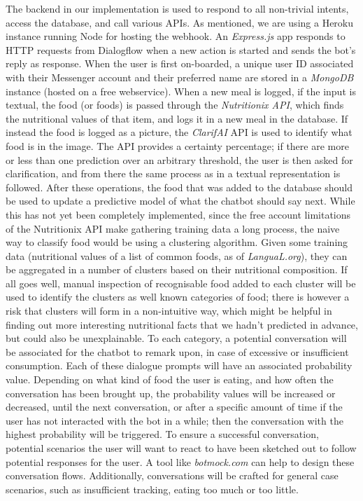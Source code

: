 \documentclass{scrartcl}
\begin{document}
The backend in our implementation is used to respond to all non-trivial intents, access the database, and call various APIs. As mentioned, we are using a Heroku instance running Node for hosting the webhook. An \textit{Express.js} app responds to HTTP requests from Dialogflow when a new action is started and sends the bot's reply as response. When the user is first on-boarded, a unique user ID associated with their Messenger account and their preferred name are stored in a \textit{MongoDB} instance (hosted on a free webservice). When a new meal is logged, if the input is textual, the food (or foods) is passed through the \textit{Nutritionix API}, which finds the nutritional values of that item, and logs it in a new meal in the database. If instead the food is logged as a picture, the \textit{ClarifAI} API is used to identify what food is in the image. The API provides a certainty percentage; if there are more or less than one prediction over an arbitrary threshold, the user is then asked for clarification, and from there the same process as in a textual representation is followed. After these operations, the food that was added to the database should be used to update a predictive model of what the chatbot should say next. While this has not yet been completely implemented, since the free account limitations of the Nutritionix API make gathering training data a long process, the naive way to classify food would be using a clustering algorithm. Given some training data (nutritional values of a list of common foods, as of \textit{LanguaL.org}), they can be aggregated in a number of clusters based on their nutritional composition. If all goes well, manual inspection of recognisable food added to each cluster will be used to identify the clusters as well known categories of food; there is however a risk that clusters will form in a non-intuitive way, which might be helpful in finding out more interesting nutritional facts that we hadn't predicted in advance, but could also be unexplainable. To each category, a potential conversation will be associated for the chatbot to remark upon, in case of excessive or insufficient consumption. Each of these dialogue prompts will have an associated probability value. Depending on what kind of food the user is eating, and how often the conversation has been brought up, the probability values will be increased or decreased, until the next conversation, or after a specific amount of time if the user has not interacted with the bot in a while; then the conversation with the highest probability will be triggered. To ensure a successful conversation, potential scenarios the user will want to react to have been sketched out to follow potential responses for the user. A tool like \textit{botmock.com} can help to design these conversation flows. Additionally, conversations will be crafted for general case scenarios, such as insufficient tracking, eating too much or too little.
\end{document}
